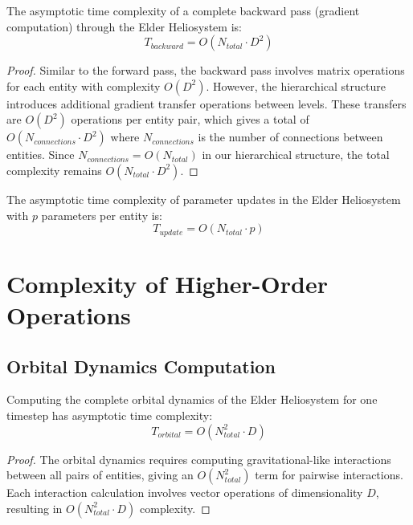 \begin{theorem}
The asymptotic time complexity of a complete backward pass (gradient computation) through the Elder Heliosystem is:
\begin{equation}
T_{backward} = O(N_{total} \cdot D^2)
\end{equation}
\end{theorem}

\begin{proof}
Similar to the forward pass, the backward pass involves matrix operations for each entity with complexity $O(D^2)$. However, the hierarchical structure introduces additional gradient transfer operations between levels. These transfers are $O(D^2)$ operations per entity pair, which gives a total of $O(N_{connections} \cdot D^2)$ where $N_{connections}$ is the number of connections between entities. Since $N_{connections} = O(N_{total})$ in our hierarchical structure, the total complexity remains $O(N_{total} \cdot D^2)$.
\end{proof}

\begin{theorem}
The asymptotic time complexity of parameter updates in the Elder Heliosystem with $p$ parameters per entity is:
\begin{equation}
T_{update} = O(N_{total} \cdot p)
\end{equation}
\end{theorem}

\section{Complexity of Higher-Order Operations}

\subsection{Orbital Dynamics Computation}

\begin{theorem}
Computing the complete orbital dynamics of the Elder Heliosystem for one timestep has asymptotic time complexity:
\begin{equation}
T_{orbital} = O(N_{total}^2 \cdot D)
\end{equation}
\end{theorem}

\begin{proof}
The orbital dynamics requires computing gravitational-like interactions between all pairs of entities, giving an $O(N_{total}^2)$ term for pairwise interactions. Each interaction calculation involves vector operations of dimensionality $D$, resulting in $O(N_{total}^2 \cdot D)$ complexity.
\end{proof}

